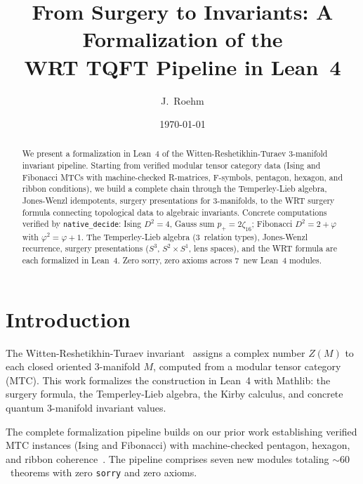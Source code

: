 \documentclass[aps,prl,twocolumn,superscriptaddress]{revtex4-2}
\newcommand{\nativedecide}{\texttt{native\_decide}}
\begin{document}
\title{From Surgery to Invariants: A Formalization of the\\
WRT TQFT Pipeline in Lean~4}

\author{J.~Roehm}

\date{\today}

\begin{abstract}
We present a formalization in Lean~4 of the
Witten-Reshetikhin-Turaev 3-manifold invariant pipeline. Starting from
verified modular tensor category data (Ising and Fibonacci MTCs with
machine-checked R-matrices, F-symbols, pentagon, hexagon, and ribbon
conditions), we build a complete chain through the Temperley-Lieb
algebra, Jones-Wenzl idempotents, surgery presentations for
3-manifolds, to the WRT surgery formula connecting topological data
to algebraic invariants. Concrete computations verified by
\nativedecide{}: Ising $D^2 = 4$, Gauss sum $p_+ = 2\zeta_{16}$;
Fibonacci $D^2 = 2 + \varphi$ with $\varphi^2 = \varphi + 1$. The Temperley-Lieb algebra (3~relation types), Jones-Wenzl recurrence,
surgery presentations ($S^3$, $S^2 \times S^1$, lens spaces), and the
WRT formula are each formalized in Lean~4. Zero sorry, zero axioms
across 7~new Lean~4 modules.
\end{abstract}

\maketitle

\section{Introduction}

The Witten-Reshetikhin-Turaev invariant~\cite{witten1989,rt1991}
assigns a complex number $Z(M)$ to each closed oriented 3-manifold $M$,
computed from a modular tensor category (MTC). This work formalizes
the construction in Lean~4 with Mathlib: the surgery formula, the
Temperley-Lieb algebra, the Kirby calculus, and concrete quantum
3-manifold invariant values.

The complete formalization pipeline builds on our prior work
establishing verified MTC instances (Ising and Fibonacci) with machine-checked
pentagon, hexagon, and ribbon coherence~\cite{paper14}. The pipeline
comprises seven new modules totaling ${\sim}60$~theorems with zero
\texttt{sorry} and zero axioms.
\end{document}
